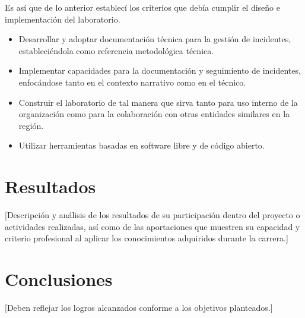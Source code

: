 \documentclass[12pt]{caltech_thesis}
\begin{document}
Es así que de lo anterior establecí los criterios que debía cumplir el diseño e implementación del laboratorio.

\begin{itemize}
    \item Desarrollar y adoptar documentación técnica para la gestión de incidentes, estableciéndola como referencia metodológica técnica.
    \item Implementar capacidades para la documentación y seguimiento de incidentes, enfocándose tanto en el contexto narrativo como en el técnico.
    \item Construir el laboratorio de tal manera que sirva tanto para uso interno de la organización como para la colaboración con otras entidades similares en la región.
    \item Utilizar herramientas basadas en software libre y de código abierto.
\end{itemize}



\chapter{Resultados}

[Descripción y análisis de los resultados de su participación dentro del proyecto o actividades realizadas, así como de las aportaciones que muestren su capacidad y criterio profesional al aplicar los conocimientos adquiridos durante la carrera.]


\chapter{Conclusiones}

[Deben reflejar los logros alcanzados conforme a los objetivos planteados.]
\end{document}
